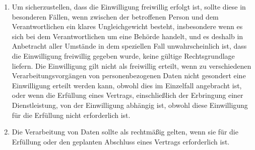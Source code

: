 \begin{enumerate}

   \item Um sicherzustellen, dass die Einwilligung freiwillig erfolgt ist, sollte diese in besonderen Fällen, wenn
    zwischen der betroffenen Person und dem Verantwortlichen ein klares Ungleichgewicht besteht, insbesondere wenn es
    sich bei dem Verantwortlichen um eine Behörde handelt, und es deshalb in Anbetracht aller Umstände in dem
    speziellen Fall unwahrscheinlich ist, dass die Einwilligung freiwillig gegeben wurde, keine gültige Rechtsgrundlage
    liefern. Die Einwilligung gilt nicht als freiwillig erteilt, wenn zu verschiedenen Verarbeitungsvorgängen von
    personenbezogenen Daten nicht gesondert eine Einwilligung erteilt werden kann, obwohl dies im Einzelfall angebracht
    ist, oder wenn die Erfüllung eines Vertrags, einschließlich der Erbringung einer Dienstleistung, von der
    Einwilligung abhängig ist, obwohl diese Einwilligung für die Erfüllung nicht erforderlich ist.%
   \label{eg:43}
   

   \item Die Verarbeitung von Daten sollte als rechtmäßig gelten, wenn sie für die Erfüllung oder den geplanten
    Abschluss eines Vertrags erforderlich ist.%
   \label{eg:44}
   


\end{enumerate}
